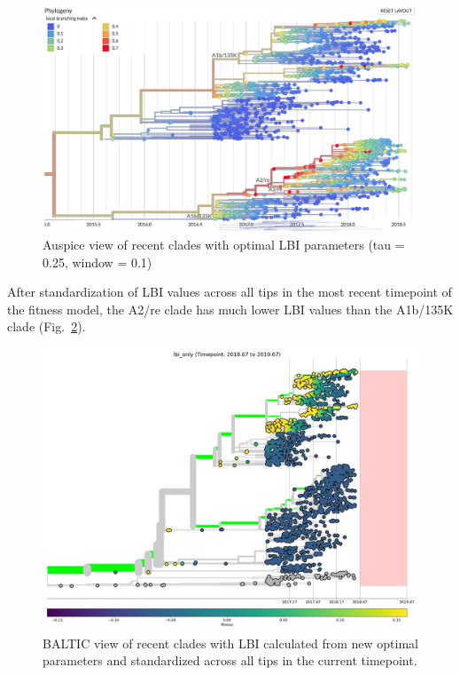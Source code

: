 \documentclass[12pt]{article}
\begin{document}
\begin{figure}[h]
\includegraphics[width=5in]{auspice-lbi-tau-0-25-window-0-1.png}
\caption{\label{auspice-lbi-with-optimal-parameters}Auspice view of recent clades with optimal LBI parameters (tau = 0.25, window = 0.1)}
\end{figure}

After standardization of LBI values across all tips in the most recent timepoint of the fitness model, the A2/re clade has much lower LBI values than the A1b/135K clade (Fig.~\ref{fitness-tree-with-lbi-predictor}).

\begin{figure}[h]
\includegraphics[width=5in]{h3n2-ha-fitness-phylogeny-lbi_2018-67.png}
\caption{\label{fitness-tree-with-lbi-predictor}BALTIC view of recent clades with LBI calculated from new optimal parameters and standardized across all tips in the current timepoint.}
\end{figure}
\end{document}
